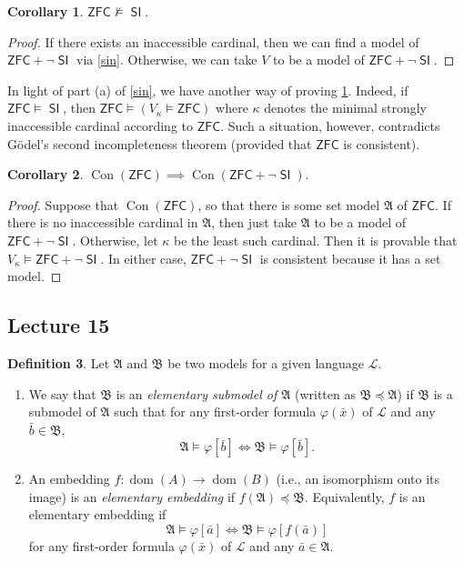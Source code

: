\documentclass[10pt,letterpaper,cm]{nupset}
\theoremstyle{definition}
\newtheorem{definition}{Definition}[subsection]
\theoremstyle{theorem}
\newtheorem{corollary}[definition]{Corollary}
\theoremstyle{remark}
\newcommand{\A}{\mathfrak A}
\renewcommand{\L}{\mathcal L}
\newcommand{\B}{\mathfrak{B}}
\newcommand{\1}{\mathbf{1}}
\newcommand{\0}{\vec 0}
\newcommand{\zfc}{\mathsf{ZFC}}
\DeclareMathOperator{\dom}{dom}
\DeclareMathOperator{\si}{\mathsf{SI}}
\DeclareMathOperator{\con}{Con}
\newcommand{\be}{\begin{enumerate}}
\newcommand{\ee}{\end{enumerate}}
\begin{document}
\begin{corollary}\label{sina}
$\zfc \nvDash \si$.
\end{corollary}
\begin{proof}
If there exists an inaccessible cardinal, then we can find a model of $\zfc + \neg{\si}$ via \cref{sin}. Otherwise, we can take $V$ to be a model of $\zfc + \neg{\si}$.
\end{proof}

\smallskip

In light of part (a) of \cref{sin}, we have another way of proving \cref{sina}. Indeed, if $\zfc \models \si$, then $\zfc \models \left(V_{\kappa} \models \zfc\right)$ where $\kappa$ denotes the minimal strongly inaccessible cardinal according to $\zfc$. Such a situation, however, contradicts G\"odel's second incompleteness theorem (provided that $\zfc$ is consistent). 

\smallskip

\begin{corollary}
$\con(\zfc) \implies \con(\zfc + \neg{\si})$.
\end{corollary}
\begin{proof}
Suppose that $\con(\zfc)$, so that there is some set model $\A$ of $\zfc$. If there is no inaccessible cardinal in $\A$, then just take $\A$ to be a model of $\zfc + \neg{\si}$. Otherwise, let $\kappa$ be the least such cardinal. Then it is provable that $V_{\kappa} \models \zfc + \neg{\si}$. In either case, $\zfc + \neg{\si}$ is consistent because it has a set model.
\end{proof}


\subsection{Lecture 15}

\begin{definition} Let $\A$ and $\B$ be two models for a given language $\L$.
\be 
\item We say that $\B$ is an \textit{elementary submodel of $\A$} (written as $\B \preceq \A$) if $\B$ is a submodel of $\A$ such that for any first-order formula $\varphi(\bar{x})$ of $\L$ and any $\bar{b} \in \B$,
\[
\A \models \varphi\left[\bar{b}\right] \iff \B \models \varphi\left[\bar{b}\right]
.\]
\item An embedding $f : \dom(A) \to \dom(B)$ (i.e., an isomorphism onto its image)  is an \textit{elementary embedding} if $f(\A) \preceq \B$. Equivalently, $f$ is an elementary embedding if $$ \A \models \varphi\left[\bar{a}\right] \iff  \B \models \varphi[f(\bar{a})]    $$ for any  first-order formula $\varphi(\bar{x})$ of $\L$ and any $\bar{a} \in \A$.
\ee
\end{definition}
\end{document}
